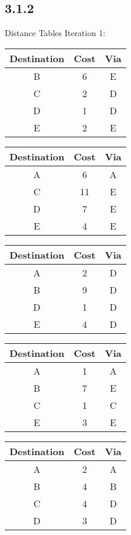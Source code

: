 \documentclass{article}
\newcommand{\8}{$\infty$}
\begin{document}
\clearpage
\subsection{3.1.2}
Distance Tables Iteration 1:\\
\begin{tabular}{c|c|c}
Destination & Cost & Via \\ \hline
B           & 6    & E   \\
C           & 2    & D   \\
D           & 1    & D   \\
E           & 2    & E   \\
\end{tabular}
\begin{tabular}{c|c|c}
Destination & Cost & Via \\ \hline
A           & 6    & A   \\
C           & 11   & E   \\
D           & 7    & E   \\
E           & 4    & E   \\
\end{tabular}
\begin{tabular}{c|c|c}
Destination & Cost & Via \\ \hline
A           & 2    & D   \\
B           & 9    & D   \\
D           & 1    & D   \\
E           & 4    & D   \\
\end{tabular}
\begin{tabular}{c|c|c}
Destination & Cost & Via \\ \hline
A           & 1    & A   \\
B           & 7    & E   \\
C           & 1    & C   \\
E           & 3    & E   \\
\end{tabular}
\begin{tabular}{c|c|c}
Destination & Cost & Via \\ \hline
A           & 2    & A   \\
B           & 4    & B   \\
C           & 4    & D   \\
D           & 3    & D   \\
\end{tabular}
\\
\end{document}
